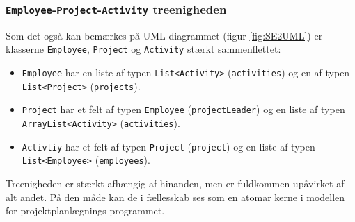 \subsubsection{\texttt{Employee}-\texttt{Project}-\texttt{Activity} treenigheden}
\label{Figurer/treenighed.pdf}
Som det også kan bemærkes på UML-diagrammet (figur \ref{fig:SE2UML}) er klasserne \texttt{Employee}, \texttt{Project} og \texttt{Activity} stærkt sammenflettet:
\begin{itemize}
    \item \texttt{Employee} har en liste af typen \texttt{List<Activity>} (\texttt{activities}) og en af typen \texttt{List<Project>} (\texttt{projects}).
    \item \texttt{Project} har et felt af typen \texttt{Employee} (\texttt{projectLeader}) og en liste af typen \texttt{ArrayList<Activity>} (\texttt{activities}).
    \item \texttt{Activtiy} har et felt af typen \texttt{Project} (\texttt{project}) og en liste af typen \texttt{List<Employee>} (\texttt{employees}).
\end{itemize}
Treenigheden er stærkt afhængig af hinanden, men er fuldkommen upåvirket af alt andet. På den måde kan de i fællesskab ses som en atomar kerne i modellen for projektplanlægnings programmet. 
